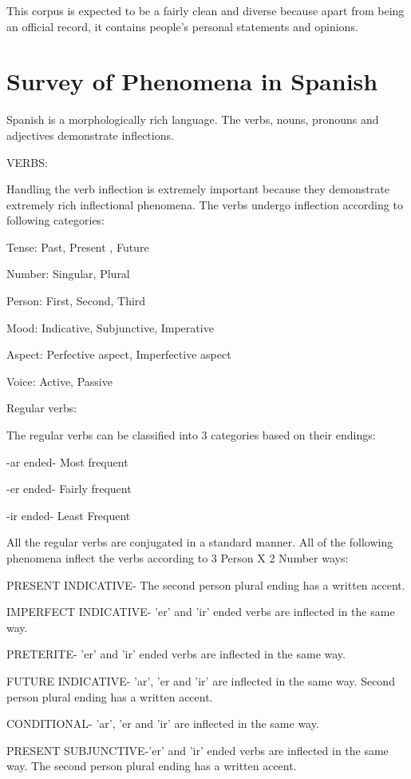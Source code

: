 \documentclass[11pt,letterpaper]{article}
\begin{document}
This corpus is expected to be a fairly clean and diverse because apart from being an official record, it contains people's personal statements and opinions.


\section{Survey of Phenomena in Spanish}

Spanish is a morphologically rich language. The verbs, nouns, pronouns and adjectives demonstrate inflections.


VERBS:

Handling the verb inflection is extremely important because they demonstrate extremely rich inflectional phenomena.
The verbs undergo inflection according to following categories:

Tense: Past, Present , Future

Number: Singular, Plural

Person: First, Second, Third

Mood: Indicative, Subjunctive, Imperative

Aspect: Perfective aspect, Imperfective aspect

Voice: Active, Passive

Regular verbs:

The regular verbs can be classified into 3 categories based on their endings:

	-ar ended- Most frequent

	-er ended- Fairly frequent

	-ir ended- Least Frequent

All the regular verbs are conjugated in a standard manner. All of the following phenomena inflect the verbs according to 3 Person X 2 Number ways:

PRESENT INDICATIVE- The second person plural ending has a written accent.

IMPERFECT INDICATIVE- 'er' and 'ir' ended verbs are inflected in the same way.

PRETERITE- 'er' and 'ir' ended verbs are inflected in the same way.

FUTURE INDICATIVE- 'ar', 'er and 'ir' are inflected in the same way. Second person plural ending has a written accent.

CONDITIONAL- 'ar', 'er and 'ir' are inflected in the same way.

PRESENT SUBJUNCTIVE-'er' and 'ir' ended verbs are inflected in the same way. The second person plural ending has a written accent.
\end{document}
